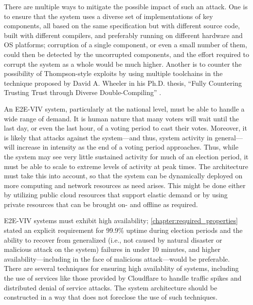There are multiple ways to mitigate the possible impact of such an
attack. One is to ensure that the system uses a diverse set of
implementations of key components, all based on the same specification
but with different source code, built with different compilers, and
preferably running on different hardware and OS platforms; corruption
of a single component, or even a small number of them, could then be
detected by the uncorrupted components, and the effort required to
corrupt the system as a whole would be much higher. Another is to
counter the possibility of Thompson-style exploits by using multiple
toolchains in the technique proposed by David A. Wheeler in his
Ph.D. thesis, ``Fully Countering Trusting Trust through Diverse
Double-Compiling'' \cite{Wheeler09}.


An E2E-VIV system, particularly at the national level, must be able to
handle a wide range of demand. It is human nature that many voters
will wait until the last day, or even the last hour, of a voting
period to cast their votes. Moreover, it is likely that attacks
against the system---and thus, system activity in general---will
increase in intensity as the end of a voting period approaches. Thus,
while the system may see very little sustained activity for much of an
election period, it must be able to scale to extreme levels of
activity at peak times. The architecture must take this into account,
so that the system can be dynamically deployed on more computing and
network resources as need arises. This might be done either by
utilizing public cloud resources that support elastic demand or by
using private resources that can be brought on- and offline as
required.


E2E-VIV systems must exhibit high availability;
\autoref{chapter:required_properties} stated an explicit requirement
for 99.9\% uptime during election periods and the ability to recover
from generalized (i.e., not caused by natural disaster or malicious
attack on the system) failures in under 10 minutes, and higher
availability---including in the face of malicious attack---would be
preferable. There are several techniques for ensuring high
availablity of systems, including the use of services like those
provided by Cloudflare to handle traffic spikes and distributed denial
of service attacks. The system architecture should be constructed in a
way that does not foreclose the use of such techniques.

